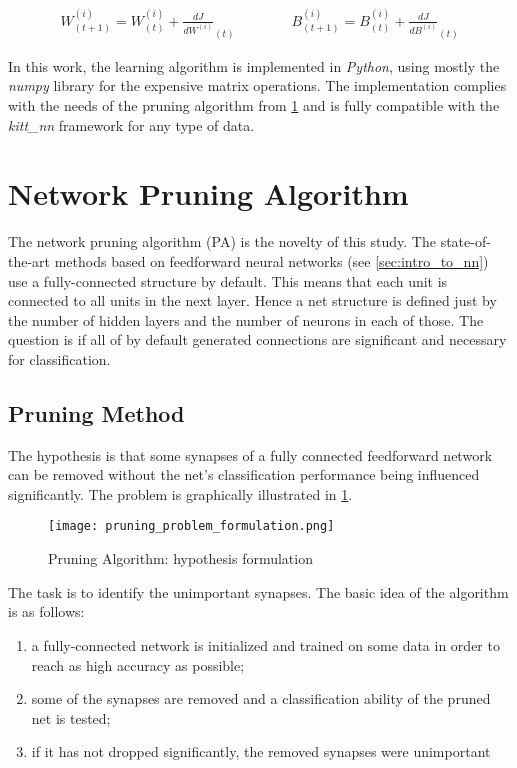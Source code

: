 \begin{align} \label{eq:params_update}
W_{(t+1)}^{(i)} = W_{(t)}^{(i)} + \frac{dJ}{dW^{(i)}}_{(t)} \qquad\qquad B_{(t+1)}^{(i)} = B_{(t)}^{(i)} + \frac{dJ}{dB^{(i)}}_{(t)}
\end{align}

In this work, the learning algorithm is implemented in \textit{Python}, using mostly the \textit{numpy} library for the expensive matrix operations. The implementation complies with the needs of the pruning algorithm from \cref{sec:network_pruning_algorithm} and is fully compatible with the \textit{kitt\_nn} framework for any type of data.

\section{Network Pruning Algorithm} \label{sec:network_pruning_algorithm}
The network pruning algorithm (PA) is the novelty of this study. The state-of-the-art methods based on feedforward neural networks (see \cref{sec:intro_to_nn}) use a fully-connected structure by default. This means that each unit is connected to all units in the next layer. Hence a net structure is defined just by the number of hidden layers and the number of neurons in each of those. The question is if all of by default generated connections are significant and necessary for classification.

\subsection{Pruning Method} \label{ssec:pa_method}
The hypothesis is that some synapses of a fully connected feedforward network can be removed without the net's classification performance being influenced significantly.  The problem is graphically illustrated in \cref{img:pruning_problem_formulation}.

\begin{figure}[H]
  \centering
  \texttt{[image: pruning\_problem\_formulation.png]}
  \caption{Pruning Algorithm: hypothesis formulation}
  \label{img:pruning_problem_formulation}
\end{figure}

The task is to identify the unimportant synapses. The basic idea of the algorithm is as follows:
\begin{enumerate}
\item a fully-connected network is initialized and trained on some data in order to reach as high accuracy as possible;
\item some of the synapses are removed and a classification ability of the pruned net is tested;
\item if it has not dropped significantly, the removed synapses were unimportant
\end{enumerate}

